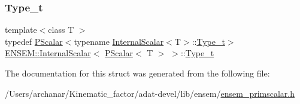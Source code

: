 \subsubsection{\texorpdfstring{Type\_t}{Type\_t}\hspace{0.1cm}{\footnotesize\ttfamily [3/3]}}
{\footnotesize\ttfamily template$<$class T $>$ \\
typedef \mbox{\hyperlink{classENSEM_1_1PScalar}{P\+Scalar}}$<$typename \mbox{\hyperlink{structENSEM_1_1InternalScalar}{Internal\+Scalar}}$<$T$>$\+::\mbox{\hyperlink{structENSEM_1_1InternalScalar_3_01PScalar_3_01T_01_4_01_4_a897c699063633ac7fc5b18fee8981b82}{Type\+\_\+t}}$>$ \mbox{\hyperlink{structENSEM_1_1InternalScalar}{E\+N\+S\+E\+M\+::\+Internal\+Scalar}}$<$ \mbox{\hyperlink{classENSEM_1_1PScalar}{P\+Scalar}}$<$ T $>$ $>$\+::\mbox{\hyperlink{structENSEM_1_1InternalScalar_3_01PScalar_3_01T_01_4_01_4_a897c699063633ac7fc5b18fee8981b82}{Type\+\_\+t}}}



The documentation for this struct was generated from the following file\+:\begin{DoxyCompactItemize}
\item 
/\+Users/archanar/\+Kinematic\+\_\+factor/adat-\/devel/lib/ensem/\mbox{\hyperlink{adat-devel_2lib_2ensem_2ensem__primscalar_8h}{ensem\+\_\+primscalar.\+h}}\end{DoxyCompactItemize}

